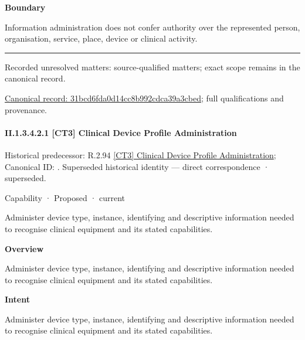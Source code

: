 \textbf{Boundary}



Information administration does not confer authority over the represented person, organisation, service, place, device or clinical activity.



\medskip\hrule\medskip

{\small Recorded unresolved matters: source-qualified matters; exact scope remains in the canonical record.}\par
{\footnotesize \href{../../../../continuum/strategy/capability/31bcd6fda0d14cc8b992cdca39a3cbed.md}{Canonical record: 31bcd6fda0d14cc8b992cdca39a3cbed}; full qualifications and provenance.}\par
\paragraph*{II.1.3.4.2.1 [CT3] Clinical Device Profile Administration}
\label{navigation:II.1.3.4.2.1}

{\small Historical predecessor: R.2.94 \hyperref[element:e8c72952da144d6883caba7fd2afb88d]{[CT3] Clinical Device Profile Administration}; Canonical ID: \texttt{}. Superseded historical identity — direct correspondence · superseded.}\par
\label{element:d0a1ba80c790476ea6042290eb7ea09e}
{\small Capability · Proposed · current}\par

Administer device type, instance, identifying and descriptive information needed to recognise clinical equipment and its stated capabilities.



\textbf{Overview}



Administer device type, instance, identifying and descriptive information needed to recognise clinical equipment and its stated capabilities.



\textbf{Intent}



Administer device type, instance, identifying and descriptive information needed to recognise clinical equipment and its stated capabilities.



